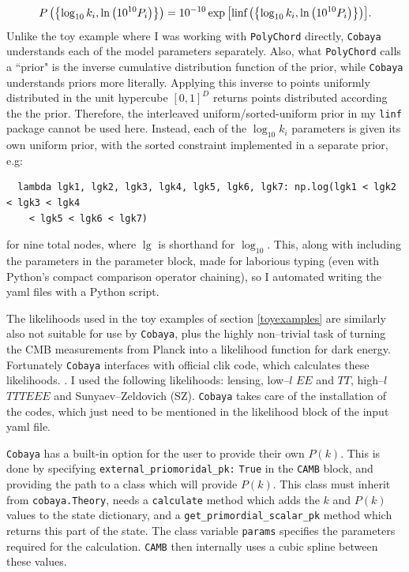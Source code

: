 \documentclass{article}
\begin{document}
\begin{equation}
  P\left(\left\{\log_{10}{k_i}, \ln{\left(10^{10}P_i\right)}\right\}\right) = 10^{-10} \exp{\left[{\textrm{linf}\left(\left\{\log_{10}{k_i}, \ln{\left(10^{10}P_i\right)}\right\}\right)}\right]}\textrm.
\end{equation}
%
Unlike the toy example where I was working with \texttt{PolyChord} directly, \texttt{Cobaya} understands each of the model parameters separately. Also, what \texttt{PolyChord} calls a ``prior" is the inverse cumulative distribution function of the prior, while \texttt{Cobaya} understands priors more literally. Applying this inverse to points uniformly distributed in the unit hypercube $[0, 1]^D$ returns points distributed according the the prior. Therefore, the interleaved uniform/sorted-uniform prior in my \texttt{linf} package cannot be used here. Instead, each of the $\log_{10}{k_i}$ parameters is given its own uniform prior, with the sorted constraint implemented in a separate prior, e.g:
\begin{verbatim}
  lambda lgk1, lgk2, lgk3, lgk4, lgk5, lgk6, lgk7: np.log(lgk1 < lgk2 < lgk3 < lgk4 
    < lgk5 < lgk6 < lgk7)
\end{verbatim}
for nine total nodes, where $\lg$ is shorthand for $\log_{10}$. This, along with including the parameters in the parameter block, made for laborious typing (even with Python's compact comparison operator chaining), so I automated writing the yaml files with a Python script.

The likelihoods used in the toy examples of section \ref{toyexamples} are similarly also not suitable for use by \texttt{Cobaya}, plus the highly non--trivial task of turning the CMB measurements from Planck into a likelihood function for dark energy. Fortunately \texttt{Cobaya} interfaces with official clik code, which calculates these likelihoods. \cite{planck_likelihoods_1, planck_likelihoods_2}. I used the following likelihoods: lensing, low--$l$ $EE$ and $TT$, high--$l$ $TTTEEE$ and Sunyaev–Zeldovich (SZ). \texttt{Cobaya} takes care of the installation of the codes, which just need to be mentioned in the likelihood block of the input yaml file.

\texttt{Cobaya} has a built-in option for the user to provide their own $P(k)$. This is done by specifying \texttt{external\_priomoridal\_pk:} \texttt{True} in the \texttt{CAMB} block, and providing the path to a class which will provide $P(k)$. This class must inherit from \texttt{cobaya.Theory}, needs a \texttt{calculate} method which adds the $k$ and $P(k)$ values to the state dictionary, and a \texttt{get\_primordial\_scalar\_pk} method which returns this part of the state. The class variable \texttt{params} specifies the parameters required for the calculation. \texttt{CAMB} then internally uses a cubic spline between these values.
\end{document}
